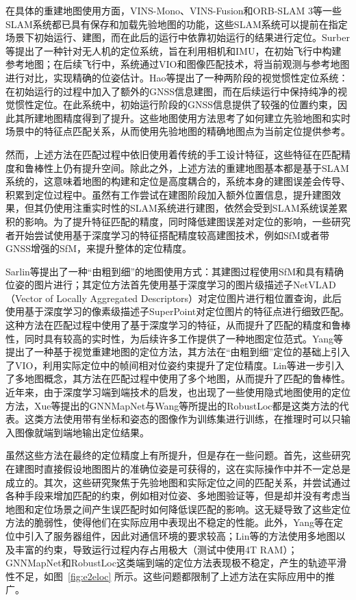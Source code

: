 在具体的重建地图使用方面，VINS-Mono、VINS-Fusion和ORB-SLAM 3等一些SLAM系统都已具有保存和加载先验地图的功能，这些SLAM系统可以提前在指定场景下初始运行、建图，而在此后的运行中依靠初始运行的结果进行定位。Surber等\cite{surber2017robust}提出了一种针对无人机的定位系统，旨在利用相机和IMU，在初始飞行中构建参考地图；在后续飞行中，系统通过VIO和图像匹配技术，将当前观测与参考地图进行对比，实现精确的位姿估计。Hao等\cite{hao2023global}提出了一种两阶段的视觉惯性定位系统：在初始运行的过程中加入了额外的GNSS信息建图，而在后续运行中保持纯净的视觉惯性定位。在此系统中，初始运行阶段的GNSS信息提供了较强的位置约束，因此其所建地图精度得到了提升。这些地图使用方法思考了如何建立先验地图和实时场景中的特征点匹配关系，从而使用先验地图的精确地图点为当前定位提供参考。

然而，上述方法在匹配过程中依旧使用着传统的手工设计特征，这些特征在匹配精度和鲁棒性上仍有提升空间。除此之外，上述方法的重建地图基本都是基于SLAM系统的，这意味着地图的构建和定位是高度耦合的，系统本身的建图误差会传导、积累到定位过程中。虽然有工作\cite{hao2023global}尝试在建图阶段加入额外位置信息，提升建图效果，但其仍使用注重实时性的SLAM系统进行建图，依然会受到SLAM系统误差累积的影响。为了提升特征匹配的精度，同时降低建图误差对定位的影响，一些研究者开始尝试使用基于深度学习的特征搭配精度较高建图技术，例如SfM或者带GNSS增强的SfM\cite{vincentqin2022colmapgps}，来提升整体的定位精度。

Sarlin等\cite{sarlin2019coarse}提出了一种“由粗到细”的地图使用方式：其建图过程使用SfM和具有精确位姿的图片进行；其定位方法首先使用基于深度学习的图片级描述子NetVLAD（Vector of Locally Aggregated Descriptors）\cite{arandjelovic2016netvlad}对定位图片进行粗位置查询，此后使用基于深度学习的像素级描述子SuperPoint\cite{detone2018superpoint}对定位图片的特征点进行细致匹配。这种方法在匹配过程中使用了基于深度学习的特征，从而提升了匹配的精度和鲁棒性，同时具有较高的实时性，为后续许多工作提供了一种地图定位范式。Yang等\cite{yang2022real}提出了一种基于视觉重建地图的定位方法，其方法在“由粗到细”定位的基础上引入了VIO，利用实际定位中的帧间相对位姿约束提升了定位精度。Lin等\cite{lin2023visual}进一步引入了多地图概念，其方法在匹配过程中使用了多个地图，从而提升了匹配的鲁棒性。近年来，由于深度学习端到端技术的启发，也出现了一些使用隐式地图使用的定位方法，Xue等\cite{xue2020learning}提出的GNNMapNet与Wang等\cite{wang2023robustloc}所提出的RobustLoc都是这类方法的代表。这类方法使用带有坐标和姿态的图像作为训练集进行训练，在推理时可以只输入图像就端到端地输出定位结果。

虽然这些方法在最终的定位精度上有所提升，但是存在一些问题。首先，这些研究在建图时直接假设地图图片的准确位姿是可获得的，这在实际操作中并不一定总是成立的。其次，这些研究聚焦于先验地图和实际定位之间的匹配关系，并尝试通过各种手段来增加匹配的约束，例如相对位姿、多地图验证等，但是却并没有考虑当地图和定位场景之间产生误匹配时如何降低误匹配的影响。这无疑导致了这些定位方法的脆弱性，使得他们在实际应用中表现出不稳定的性能。此外，Yang等\cite{yang2022real}在定位中引入了服务器组件，因此对通信环境的要求较高；Lin等\cite{lin2023visual}的方法使用多地图以及丰富的约束，导致运行过程内存占用极大（测试中使用4T RAM）；GNNMapNet和RobustLoc这类端到端的定位方法表现极不稳定，产生的轨迹平滑性不足，如图~\ref{fig:e2eloc} 所示。这些问题都限制了上述方法在实际应用中的推广。

